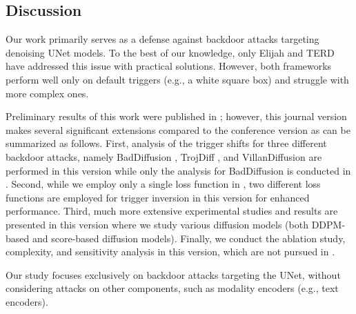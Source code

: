 \subsection{Discussion}
Our work primarily serves as a defense against backdoor attacks targeting denoising UNet models. To the best of our knowledge, only Elijah \cite{an2024elijah} and TERD \cite{mo2024terd} have addressed this issue with practical solutions. However, both frameworks perform well only on default triggers (e.g., a white square box) and struggle with more complex ones.

Preliminary results of this work were published in \cite{Vu2025ICC}; however, this journal version makes several significant extensions compared to the conference version as can be summarized as follows. First, analysis of the trigger shifts  for three different backdoor attacks, namely BadDiffusion \cite{Chou2023CVPR}, TrojDiff \cite{chen2023trojdiff}, and VillanDiffusion \cite{chou2024villandiffusion} are performed in this version while only the analysis for BadDiffusion is conducted in \cite{Vu2025ICC}. Second, while we employ only a single loss function in  \cite{Vu2025ICC}, two different loss functions are employed for trigger inversion in this version for enhanced performance. Third, much more extensive experimental studies and results are presented in this version where we study various diffusion models (both DDPM-based and score-based diffusion models). %
Finally, we conduct the ablation study, complexity, and sensitivity analysis in this version, which are not pursued in \cite{Vu2025ICC}.


Our study focuses exclusively on backdoor attacks targeting the UNet, without considering attacks on other components, such as modality encoders (e.g., text encoders).